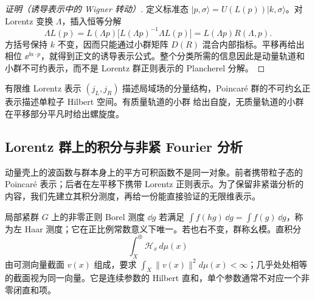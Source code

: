 \begin{proof}[证明（诱导表示中的 Wigner 转动）]
定义标准态 $|p,\sigma\rangle=U(L(p))|k,\sigma\rangle$。对 Lorentz 变换 $\Lambda$，插入恒等分解
\[
\Lambda L(p)=L(\Lambda p)\bigl[L(\Lambda p)^{-1}\Lambda L(p)\bigr]
=L(\Lambda p)R(\Lambda,p).
\]
方括号保持 $k$ 不变，因而只能通过小群矩阵 $D(R)$ 混合内部指标。平移再给出相位 $\ee^{\ii a\cdot p}$，就得到正文的诱导表示公式。整个分类所需的信息因此是动量轨道和小群不可约表示，而不是 Lorentz 群正则表示的 Plancherel 分解。
\end{proof}

有限维 Lorentz 表示 $(j_L,j_R)$ 描述局域场的分量结构，Poincar\'e
群的不可约幺正表示描述单粒子 Hilbert 空间。有质量轨道的小群
给出自旋，无质量轨道的小群在平移部分平凡时给出螺旋度。

\subsection{Lorentz 群上的积分与非紧 Fourier 分析}

动量壳上的波函数与群本身上的平方可积函数不是同一对象。前者携带粒子态的 Poincar\'e 表示；后者在左平移下携带 Lorentz 正则表示。为了保留非紧谐分析的内容，我们先建立其积分测度，再给一份能直接验证的无限维表示。

\begin{definition}
局部紧群 $G$ 上的非零正则 Borel 测度 $\dd g$ 若满足 $\int f(hg)\,\dd g=\int f(g)\,\dd g$，称为左 Haar 测度；它在正比例常数意义下唯一。若也右不变，群称幺模。直积分
\[
 \int_X^\oplus\mathcal H_x\,d\mu(x)
\]
由可测向量截面 $v(x)$ 组成，要求 $\int_X\|v(x)\|^2d\mu(x)<\infty$；几乎处处相等的截面视为同一向量。它是连续参数的 Hilbert 直和，单个参数通常不对应一个非零闭直和项。
\end{definition}

